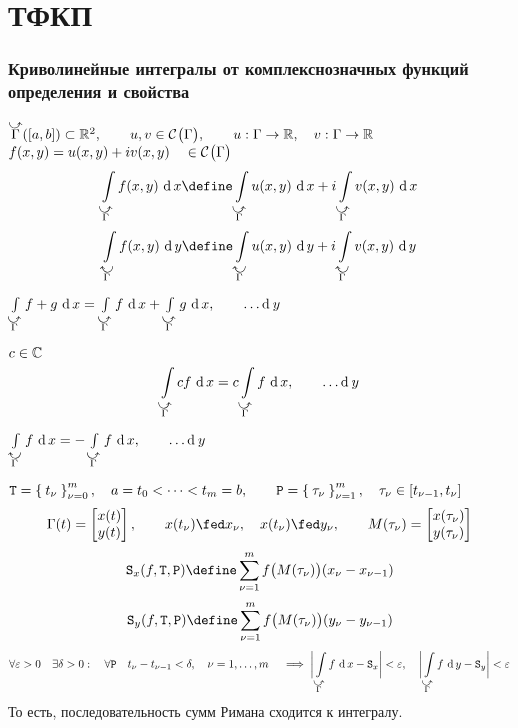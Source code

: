 \part{ТФКП}

\section{Криволинейные интегралы от комплекснозначных функций  определения и свойства}

\begin{definition}
	$ \curvedir \Gamma([a, b]) \sub \R^2, \qquad u, v \in \Cont \Gamma, \qquad u : \Gamma \to \R, \quad v : \Gamma \to \R $ \\
	$ f(x, y) = u(x, y) + iv(x, y) \quad \in \Cont \Gamma $
	$$ \cint[x]{\curvedir \Gamma}{f(x, y)} \define \cint[x]{\curvedir \Gamma}{u(x, y)} + i \cint[x]{\curvedir \Gamma}{v(x, y)} $$
	$$ \cint[y]{\curvedir[0] \Gamma}{f(x, y)} \define \cint[y]{\curvedir[0] \Gamma}{u(x, y)} + i \cint[y]{\curvedir[0] \Gamma}{v(x, y)} $$
\end{definition}

\begin{props}
	\item $ \cint[x]{\curvedir \Gamma}{f + g} = \cint[x]{\curvedir \Gamma}f + \cint[x]{\curvedir \Gamma}g, \qquad \dots \di y $
	\item $ c \in \Co $
	$$ \cint[x]{\curvedir \Gamma}{cf} = c \cint[x]{\curvedir \Gamma}f, \qquad \dots \di y $$
	\item $ \cint[x]{\curvedir[0] \Gamma}f = - \cint[x]{\curvedir \Gamma}f, \qquad \dots \di y $
	\item $ \mathtt T = \seqz[m]{t_\nu}\nu, \quad a = t_0 < \dots < t_m = b, \qquad \mathtt P = \seq[m]{\tau_\nu}\nu, \quad \tau_\nu \in [t_{\nu - 1}, t_\nu] $
	$$ \Gamma(t) =
	\begin{bmatrix}
		x(t) \\
		y(t)
	\end{bmatrix}, \qquad x(t_\nu) \fed x_\nu, \quad x(t_\nu) \fed y_\nu, \qquad M(\tau_\nu) =
	\begin{bmatrix}
		x(\tau_\nu) \\
		y(\tau_\nu)
	\end{bmatrix} $$
	$$ \mathtt S_x(f, \mathtt T, \mathtt P) \define \sum_{\nu = 1}^m f \big( M(\tau_\nu) \big) (x_\nu - x_{\nu - 1}) $$
	$$ \mathtt S_y(f, \mathtt T, \mathtt P) \define \sum_{\nu = 1}^m f \big( M(\tau_\nu) \big) (y_\nu - y_{\nu - 1}) $$
	$$ \forall \eps > 0 \quad \exists \delta > 0 : \quad \forall \mathtt P \quad t_\nu - t_{\nu - 1} < \delta, \quad \nu = 1, \dots, m \quad \implies \bigg| \cint[x]{\curvedir\Gamma}f - \mathtt S_x \bigg| < \eps, \quad \bigg| \cint[y]{\curvedir\Gamma}f - \mathtt S_y \bigg| < \eps $$
	То есть, последовательность сумм Римана сходится к интегралу.
\end{props}


